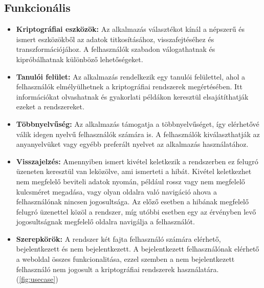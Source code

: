 \subsection{Funkcionális}

\begin{itemize}
	\item\textbf{Kriptográfiai eszközök:} Az alkalmazás választékot kínál a népszerű és ismert eszközökből az adatok titkosításához, visszafejtéséhez és transzformációjához. A felhasználók szabadon válogathatnak és kipróbálhatnak különböző lehetőségeket.

	\item\textbf{Tanulói felület:} Az alkalmazás rendelkezik egy tanulói felülettel, ahol a felhasználók elmélyülhetnek a kriptográfiai rendszerek megértésében. Itt információkat olvashatnak és gyakorlati példákon keresztül elsajátíthatják ezeket a rendszereket.

	\item\textbf{Többnyelvűség:} Az alkalmazás támogatja a többnyelvűséget, így elérhetővé válik idegen nyelvű felhasználók számára is. A felhasználók kiválaszthatják az anyanyelvüket vagy egyébb preferált nyelvet az alkalmazás használatához.

	\item\textbf{Visszajelzés:} Amennyiben ismert kivétel keletkezik a rendszerben ez felugró üzeneten keresztül van leközölve, ami ismerteti a hibát. Kivétel keletkezhet nem megfelelő beviteli adatok nyomán, például rossz vagy nem megfelelő kulcsméret megadása, vagy olyan oldalra való navigáció ahova a felhasználónak nincsen jogosultsága. Az előző esetben a hibának megfelelő felugró üzenettel közöl a rendszer, míg utóbbi esetben egy az érvényben levő jogosultságnak megfelelő oldalra navigálja a felhasználót.

	\item\textbf{Szerepkörök:} A rendszer két fajta felhasználó számára elérhető, bejelentkezett és nem bejelentkezett. A bejelentkezett felhasználónak elérhető a weboldal összes funkcionalitása, ezzel szemben a nem bejelentkezett felhasználó nem jogosult a kriptográfiai rendszerek használatára.  (\ref{fig:usecase})
\end{itemize}

